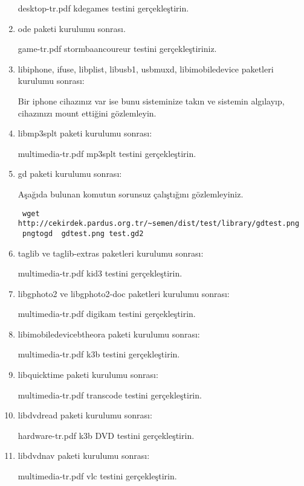 \documentclass[a4paper,10pt]{article}
\begin{document}
\begin{enumerate}
desktop-tr.pdf kdegames testini gerçekleştirin.
\item ode paketi kurulumu sonrası.

game-tr.pdf stormbaancoureur testini gerçekleştiriniz.

\item libiphone, ifuse, libplist, libusb1, usbmuxd, libimobiledevice paketleri kurulumu sonrası:

Bir iphone cihazınız var ise bunu sisteminize takın ve sistemin algılayıp, cihazınızı mount ettiğini gözlemleyin.

\item libmp3splt paketi kurulumu sonrası:

multimedia-tr.pdf mp3splt testini gerçekleştirin.

\item gd paketi kurulumu sonrası:

Aşağıda bulunan komutun sorunsuz çalıştığını gözlemleyiniz.

\begin{verbatim}
 wget http://cekirdek.pardus.org.tr/~semen/dist/test/library/gdtest.png
 pngtogd  gdtest.png test.gd2
\end{verbatim}

\item taglib ve taglib-extras paketleri kurulumu sonrası:

multimedia-tr.pdf kid3 testini gerçekleştirin.

\item libgphoto2 ve libgphoto2-doc paketleri kurulumu sonrası:

multimedia-tr.pdf digikam testini gerçekleştirin.

\item libimobiledevicebtheora paketi kurulumu sonrası:

multimedia-tr.pdf k3b testini gerçekleştirin.

\item libquicktime paketi kurulumu sonrası:

multimedia-tr.pdf transcode testini gerçekleştirin.

\item libdvdread paketi kurulumu sonrası:

hardware-tr.pdf k3b DVD testini gerçekleştirin.

\item libdvdnav paketi kurulumu sonrası:

multimedia-tr.pdf vlc testini gerçekleştirin.


\end{enumerate}
\end{document}
